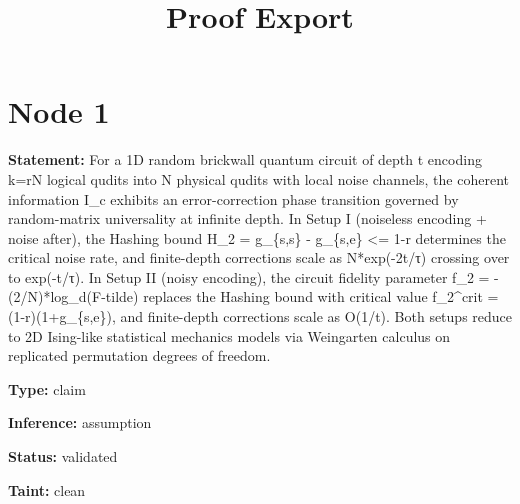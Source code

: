 \documentclass{article}
\title{Proof Export}
\date{}
\begin{document}
\maketitle

\section*{Node 1}

\textbf{Statement:} For a 1D random brickwall quantum circuit of depth t encoding k=rN logical qudits into N physical qudits with local noise channels, the coherent information I\_c exhibits an error-correction phase transition governed by random-matrix universality at infinite depth. In Setup I (noiseless encoding + noise after), the Hashing bound H\_2 = g\_\{s,s\} - g\_\{s,e\} <= 1-r determines the critical noise rate, and finite-depth corrections scale as N*exp(-2t/τ) crossing over to exp(-t/τ). In Setup II (noisy encoding), the circuit fidelity parameter f\_2 = -(2/N)*log\_d(F-tilde) replaces the Hashing bound with critical value f\_2\textasciicircum{}crit = (1-r)(1+g\_\{s,e\}), and finite-depth corrections scale as O(1/t). Both setups reduce to 2D Ising-like statistical mechanics models via Weingarten calculus on replicated permutation degrees of freedom.

\textbf{Type:} claim

\textbf{Inference:} assumption

\textbf{Status:} validated

\textbf{Taint:} clean
\end{document}
